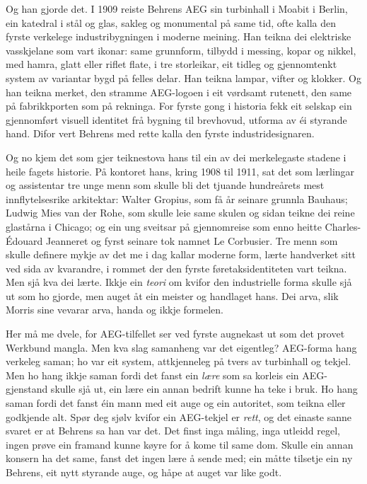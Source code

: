 Og han gjorde det. I 1909 reiste Behrens AEG sin turbinhall i Moabit i Berlin, ein katedral i stål og glas, sakleg og monumental på same tid, ofte kalla den fyrste verkelege industribygningen i moderne meining. Han teikna dei elektriske vasskjelane som vart ikonar: same grunnform, tilbydd i messing, kopar og nikkel, med hamra, glatt eller riflet flate, i tre storleikar, eit tidleg og gjennomtenkt system av variantar bygd på felles delar. Han teikna lampar, vifter og klokker. Og han teikna merket, den stramme AEG-logoen i eit vørdsamt rutenett, den same på fabrikkporten som på rekninga. For fyrste gong i historia fekk eit selskap ein gjennomført visuell identitet frå bygning til brevhovud, utforma av éi styrande hand. Difor vert Behrens med rette kalla den fyrste industridesignaren.

Og no kjem det som gjer teiknestova hans til ein av dei merkelegaste stadene i heile fagets historie. På kontoret hans, kring 1908 til 1911, sat det som lærlingar og assistentar tre unge menn som skulle bli det tjuande hundreårets mest innflytelsesrike arkitektar: Walter Gropius, som få år seinare grunnla Bauhaus; Ludwig Mies van der Rohe, som skulle leie same skulen og sidan teikne dei reine glastårna i Chicago; og ein ung sveitsar på gjennomreise som enno heitte Charles-Édouard Jeanneret og fyrst seinare tok namnet Le Corbusier. Tre menn som skulle definere mykje av det me i dag kallar moderne form, lærte handverket sitt ved sida av kvarandre, i rommet der den fyrste føretaksidentiteten vart teikna. Men sjå kva dei lærte. Ikkje ein \emph{teori} om kvifor den industrielle forma skulle sjå ut som ho gjorde, men auget åt ein meister og handlaget hans. Dei arva, slik Morris sine vevarar arva, handa og ikkje formelen.

Her må me dvele, for AEG-tilfellet ser ved fyrste augnekast ut som det provet Werkbund mangla. Men kva slag samanheng var det eigentleg? AEG-forma hang verkeleg saman; ho var eit system, attkjenneleg på tvers av turbinhall og tekjel. Men ho hang ikkje saman fordi det fanst ein \emph{lære} som sa korleis ein AEG-gjenstand skulle sjå ut, ein lære ein annan bedrift kunne ha teke i bruk. Ho hang saman fordi det fanst éin mann med eit auge og ein autoritet, som teikna eller godkjende alt. Spør deg sjølv kvifor ein AEG-tekjel er \emph{rett}, og det einaste sanne svaret er at Behrens sa han var det. Det finst inga måling, inga utleidd regel, ingen prøve ein framand kunne køyre for å kome til same dom. Skulle ein annan konsern ha det same, fanst det ingen lære å sende med; ein måtte tilsetje ein ny Behrens, eit nytt styrande auge, og håpe at auget var like godt.

